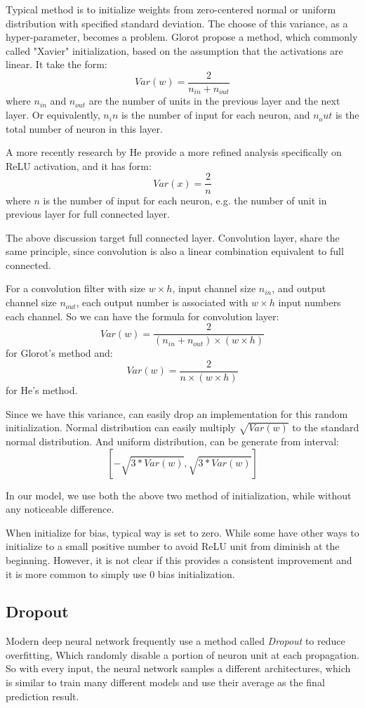 \documentclass[10pt,twocolumn,letterpaper]{article}
\begin{document}
Typical method is to initialize weights from zero-centered normal or uniform distribution with specified
standard deviation. The choose of this variance, as a hyper-parameter, becomes a problem.
Glorot\cite{glorot2010understanding} propose a method, which commonly called "Xavier" initialization,
based on the assumption that the activations are linear. It take the form:
$$
Var(w) = \frac{2}{n_{in}+n_{out}}
$$
where $n_{in}$ and $n_{out}$ are the number of units in the previous layer and the next layer.
Or equivalently, $n_in$ is the number of input for each neuron, and $n_out$ is the total number of
neuron in this layer.

A more recently research by He\cite{he2015delving} provide a more refined analysis specifically
on ReLU activation, and it has form:
$$
Var(x) = \frac{2}{n}
$$
where $n$ is the number of input for each neuron, e.g. the number of unit in previous layer for
full connected layer.

The above discussion target full connected layer. Convolution layer, share the same principle,
since convolution is also a linear combination equivalent to full connected.

For a convolution filter with size $w\times h$, input channel size $n_{in}$, and output channel size
$n_{out}$, each output number is associated with $w\times h$ input numbers each channel. So we can have
the formula for convolution layer:
$$
Var(w) = \frac{2}{(n_{in} + n_{out}) \times (w\times h)}
$$
for Glorot's method and:
$$
Var(w) = \frac{2}{n \times (w\times h)}
$$
for He's method.

Since we have this variance, can easily drop an implementation for this random initialization. 
Normal distribution can easily multiply $\sqrt{Var(w)}$ to the standard normal distribution.
And uniform distribution, can be generate from interval:
$$
[-\sqrt{3*Var(w)}, \sqrt{3*Var(w)}]
$$

In our model, we use both the above two method of initialization, while without any noticeable
difference.

When initialize for bias, typical way is set to zero. While some have other ways\cite{krizhevsky2012imagenet}
to initialize to a small positive number to avoid ReLU unit from diminish at the beginning.
However, it is not clear if this provides a consistent improvement and it is more common to
simply use 0 bias initialization\cite{cs231nInit}.

\subsection{Dropout}
Modern deep neural network frequently use a method called \emph{Dropout}
to reduce overfitting\cite{srivastava2014dropout},
Which randomly disable a portion of neuron unit at each propagation. So with every input, the neural
network samples a different architectures\cite{krizhevsky2012imagenet}, which is similar to train many
different models and use their average as the final prediction result.
\end{document}
